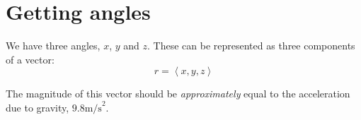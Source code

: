 \documentclass{article}
\begin{document}
\section{Getting angles}
We have three angles, \(x\), \(y\) and \(z\). These can be represented as three
components of a vector:
\[ r = \left\langle x, y, z \right\rangle \]

The magnitude of this vector should be \emph{approximately} equal to the
acceleration due to gravity, \(9.8{\text{m/s}}^2\).
\end{document}
